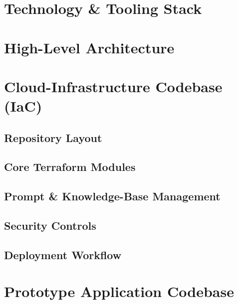 \section{Technology & Tooling Stack}

\section{High-Level Architecture}

\section{Cloud-Infrastructure Codebase (IaC)}

\subsection{Repository Layout}

\subsection{Core Terraform Modules}

\subsection{Prompt & Knowledge-Base Management}

\subsection{Security Controls}

\subsection{Deployment Workflow}

\section{Prototype Application Codebase}

